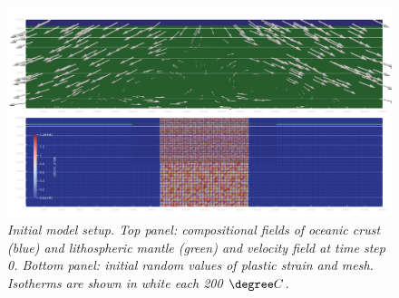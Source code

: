 \begin{figure}
\centering
\includegraphics[width=\textwidth]{cookbooks/oceanic_extension/doc/figure_initial_setup.png}
\caption{\it Initial model setup. Top panel: compositional fields of oceanic crust (blue) and lithospheric mantle (green) and velocity field at time step 0. Bottom panel: initial random values of plastic strain and mesh. Isotherms are shown in white each 200 $\degree C$.}
\label{fig:figure_initial_setup}
\end{figure}

